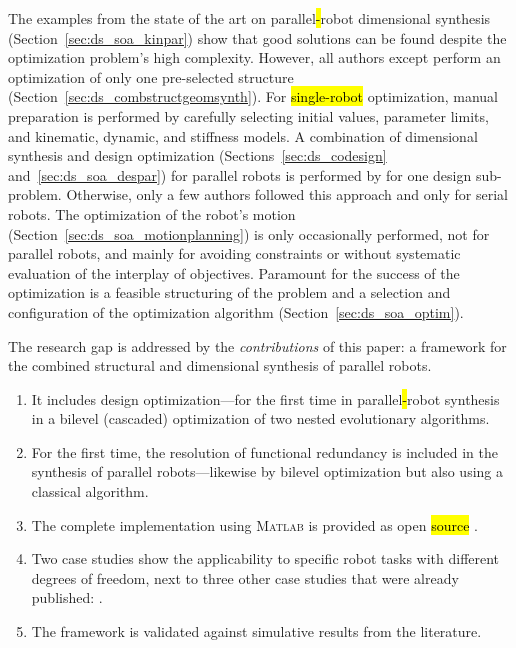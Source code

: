 The examples from the state of the art on parallel\hl{-}robot dimensional synthesis \mbox{(Section~\ref{sec:ds_soa_kinpar})} show that good solutions can be found despite the optimization problem's high complexity.
However, all authors except \cite{Prause2016,BenHamidaLarMliRom2021} perform an optimization of only one pre-selected structure (Section~\ref{sec:ds_combstructgeomsynth}).
For \hl{single-robot} optimization, manual preparation is performed by carefully selecting initial values, parameter limits, and kinematic, dynamic, and stiffness models.
A combination of dimensional synthesis and design optimization (Sections~\ref{sec:ds_codesign} and~\ref{sec:ds_soa_despar}) for parallel robots is performed by \cite{Prause2016,WangZhaCheHua2017} for one design sub-problem.
Otherwise, only a few authors followed this approach and only for serial robots.
The optimization of the robot's motion (Section~\ref{sec:ds_soa_motionplanning}) is only occasionally performed, not for parallel robots, and mainly for avoiding constraints or without systematic evaluation of the interplay of objectives.
Paramount for the success of the optimization is a feasible structuring of the problem and a selection and configuration of the optimization algorithm (Section~\ref{sec:ds_soa_optim}). %

The research gap is addressed by the \emph{contributions} of this paper: a framework for the combined structural and dimensional synthesis of parallel robots.

\begin{enumerate}
  \item {It includes design optimization---for the first time in parallel\hl{-}robot synthesis in a bilevel (cascaded) optimization of two nested evolutionary algorithms.} %
  \item {For the first time, the resolution of functional redundancy is included in the synthesis of parallel robots---likewise by bilevel optimization but also using a classical algorithm.}
  \item {The complete implementation using \textsc{Matlab} is provided as open \hl{source} %
    \cite{GitHub_StructDimSynth}.}
  \item {Two case studies show the applicability to specific robot tasks with different degrees of freedom, next to three other case studies that were already published: \cite{SchapplerJahRaaOrt2022,SterneckFetSch2023,MohammadSeeSch2024}.}
  \item {The framework is validated against simulative results from the literature.}
\end{enumerate}